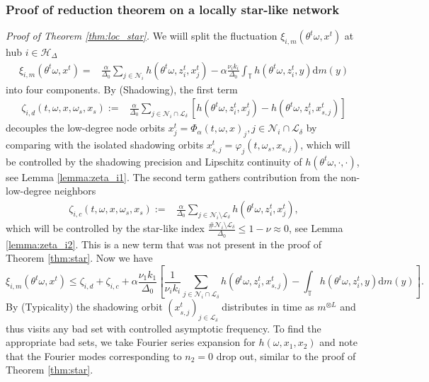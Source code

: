 \documentclass[a4paper]{article}
\theoremstyle{plain}
\theoremstyle{definition}
\newcommand{\T}{\mathbb{T}}
\newcommand{\Z}{\mathbb{Z}}
\newcommand{\Hil}{\mathcal{H}}
\newcommand{\Lil}{\mathcal{L}}
\newcommand{\Nil}{\mathcal{N}}
\begin{document}
\subsubsection{Proof of reduction theorem on a locally star-like network}
\textit{Proof of Theorem \ref{thm:loc_star}.}
We wiill split the fluctuation $\xi_{i,m}(\theta^t\omega,x^t)$ at hub $i\in\Hil_{\Delta}$ 
\begin{align*}
	\xi_{i,m}(\theta^t\omega,x^t) =&  \frac{\alpha}{\Delta_0} \sum_{j\in \Nil_i} h(\theta^t\omega,z_i^t,x_j^t) - \alpha\frac{\nu_i k_i}{\Delta_0}\int_{\T} h(\theta^t\omega,z_i^t,y)\mathrm{d}m(y) 
\end{align*}
into four components. By (Shadowing), the first term 
\begin{align*} \tag*{(decoupling)}
	\zeta_{i,d}(t,\omega,x,\omega_{{s}},x_{{s}}) :=& \frac{\alpha}{\Delta_0} \sum_{j\in\Nil_i\cap\Lil_{\delta}} \left[ h(\theta^t\omega,z_i^t,x_j^t) - h(\theta^t\omega,z_i^t,x_{{s},j}^t) \right]
\end{align*}
decouples the low-degree node orbits $x_j^t=\Phi_{\alpha}(t,\omega,x)_j, j\in\Nil_i\cap \Lil_{\delta}$ by comparing with the isolated shadowing orbits $x_{{s},j}^t =\varphi_j(t,\omega_{{s}},x_{{s},j})$, which will be controlled by the shadowing precision and Lipschitz continuity of $h(\theta^t\omega,\cdot,\cdot)$, see Lemma \ref{lemma:zeta_i1}. The second term gathers  contribution from the non-low-degree neighbors
\begin{align*}\tag*{(non~ldn)}
	\zeta_{i,c}(t,\omega,x,\omega_{{s}},x_{{s}}) := & \frac{\alpha}{\Delta_0} \sum_{j\in \Nil_i\setminus\Lil_{\delta}} h(\theta^t\omega,z_i^t,x_j^t),
\end{align*}
which will be controlled by the star-like index $\frac{\# \Nil_i\setminus\Lil_{\delta}}{\Delta_0}\leq 1-\nu\approx0$, see Lemma \ref{lemma:zeta_i2}. This is a new term that was not present in the proof of Theorem \ref{thm:star}. Now we have
$$\xi_{i,m}(\theta^t\omega,x^t) \leq \zeta_{i,d} + \zeta_{i,c} + \alpha \frac{\nu_1k_1}{\Delta_0}\left[ \frac{1}{\nu_ik_i}\sum_{j\in\Nil_i\cap\Lil_{\delta}}h(\theta^t\omega,z_i^t,x_{{s},j}^t) -\int_{\T}h(\theta^t\omega,z_i^t,y)\mathrm{d}m(y)\right].$$
By (Typicality) the shadowing orbit $\left(x_{{s},j}^t\right)_{j\in\Lil_{\delta}}$ distributes in time as $m^{\otimes L}$ and thus visits any bad set with controlled asymptotic frequency. To find the appropriate bad sets, we take Fourier series expansion for $h(\omega,x_1,x_2)$ and note that the Fourier modes corresponding to $n_2=0$ drop out, similar to the proof of Theorem \ref{thm:star}.
\end{document}
